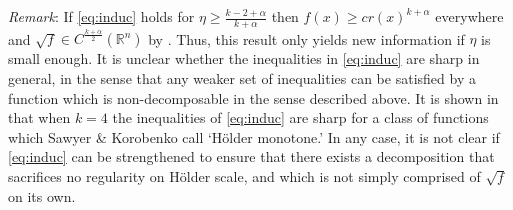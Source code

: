 \documentclass[oneside,hidelinks,indentfirst,10pt]{book}
\begin{document}
\textit{Remark}: If \eqref{eq:induc} holds for \(\eta\geq \frac{k-2+\alpha}{k+\alpha}\) then \(f(x)\geq cr(x)^{k+\alpha}\) everywhere and \(\sqrt{f}\in C^\frac{k+\alpha}{2}(\mathbb{R}^n)\) by . Thus, this result only yields new information if \(\eta\) is small enough. It is unclear whether the inequalities in \eqref{eq:induc} are sharp in general, in the sense that any weaker set of inequalities can be satisfied by a function which is non-decomposable in the sense described above. It is shown in \cite{SOS_I} that when \(k=4\) the inequalities of \eqref{eq:induc} are sharp for a class of functions which Sawyer \& Korobenko call `H\"older monotone.' In any case, it is not clear if \eqref{eq:induc} can be strengthened to ensure that there exists a decomposition that sacrifices no regularity on H\"older scale, and which is not simply comprised of \(\sqrt{f}\) on its own. 
\end{document}
